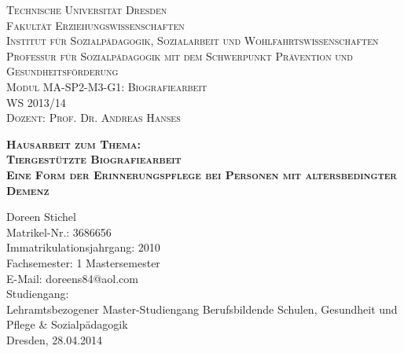 \begin{titlepage}
\begin{flushleft}
\Large
\scshape
Technische Universität Dresden\\
\normalsize
\upshape
Fakultät Erziehungswissenschaften\\
Institut für Sozialpädagogik, Sozialarbeit und Wohlfahrtswissenschaften\\
Professur für Sozialpädagogik mit dem Schwerpunkt Prävention und Gesundheitsförderung\\[0,5cm]
Modul MA-SP2-M3-G1: Biografiearbeit\\[0,5cm]
WS 2013/14\\
Dozent: Prof. Dr. Andreas Hanses\\
\end{flushleft}

\vfill

\begin{center}
\Huge
\scshape
\bfseries
Hausarbeit zum Thema:\\[1,0cm]
\Large
\mdseries
Tiergestützte Biografiearbeit\\[0,5cm]
Eine Form der Erinnerungspflege bei Personen mit altersbedingter Demenz\\
\end{center}

\vfill

\begin{flushleft}
Doreen Stichel\\
Matrikel-Nr.: 3686656\\
Immatrikulationsjahrgang: 2010\\
Fachsemester: 1 Mastersemester\\
E-Mail: doreens84@aol.com\\[0,5cm]
Studiengang:\\
Lehramtsbezogener Master-Studiengang Berufsbildende Schulen, Gesundheit und Pflege \& Sozialpädagogik\\[0,5cm]
Dresden, 28.04.2014
\end{flushleft}

\end{titlepage}